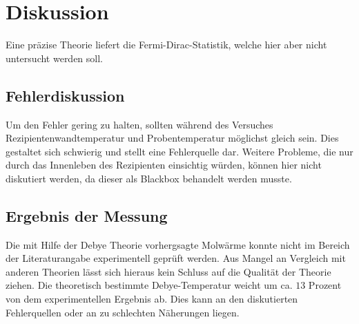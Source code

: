 \section{Diskussion}
\label{sec:Diskussion}
Eine präzise Theorie liefert die Fermi-Dirac-Statistik, welche hier aber nicht untersucht werden soll.
\subsection{Fehlerdiskussion}
Um den Fehler gering zu halten, sollten während des Versuches Rezipientenwandtemperatur und Probentemperatur möglichst gleich sein. Dies gestaltet sich schwierig und stellt eine Fehlerquelle dar. Weitere Probleme, die nur durch das Innenleben des Rezipienten einsichtig würden, können hier nicht diskutiert werden, da dieser als Blackbox behandelt werden musste.
\subsection{Ergebnis der Messung}
Die mit Hilfe der Debye Theorie vorhergsagte Molwärme konnte nicht im Bereich der Literaturangabe experimentell geprüft werden.
Aus Mangel an Vergleich mit anderen Theorien lässt sich hieraus kein Schluss auf die Qualität der Theorie ziehen.
Die theoretisch bestimmte Debye-Temperatur weicht um ca. $13$ Prozent von dem experimentellen Ergebnis ab. Dies kann an den diskutierten Fehlerquellen oder an zu schlechten Näherungen liegen.